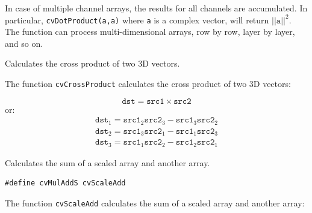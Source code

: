 In case of multiple channel arrays, the results for all channels are accumulated. In particular, \texttt{cvDotProduct(a,a)} where \texttt{a} is a complex vector, will return $||\texttt{a}||^2$.
The function can process multi-dimensional arrays, row by row, layer by layer, and so on.

\label{CrossProduct}

Calculates the cross product of two 3D vectors.


\begin{description}
\end{description}


The function \texttt{cvCrossProduct} calculates the cross product of two 3D vectors:

\[ \texttt{dst} = \texttt{src1} \times \texttt{src2} \]
or:
\[
\begin{array}{l}
\texttt{dst}_1 = \texttt{src1}_2 \texttt{src2}_3 - \texttt{src1}_3 \texttt{src2}_2\\
\texttt{dst}_2 = \texttt{src1}_3 \texttt{src2}_1 - \texttt{src1}_1 \texttt{src2}_3\\
\texttt{dst}_3 = \texttt{src1}_1 \texttt{src2}_2 - \texttt{src1}_2 \texttt{src2}_1
\end{array}
\]

\label{ScaleAdd}

Calculates the sum of a scaled array and another array.

\begin{lstlisting}
#define cvMulAddS cvScaleAdd
\end{lstlisting}

\begin{description}
\end{description}

The function \texttt{cvScaleAdd} calculates the sum of a scaled array and another array:

